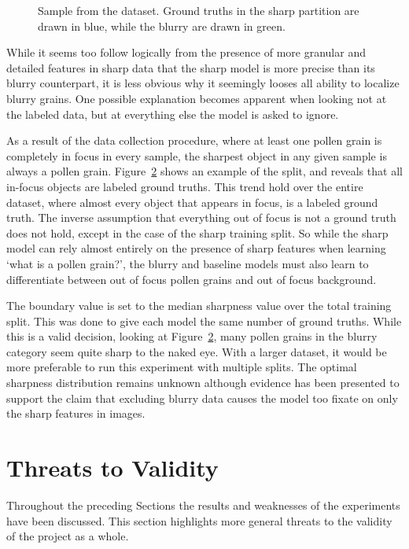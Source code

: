 \begin{figure}[htbp]
\begin{subfigure}[t]{0.35\textwidth}
    \label{fig:results-sharpness-blurry}
  \end{subfigure}
  \caption[Data sample showing split between sharp and blurry data]{%
Sample from the dataset. Ground truths in the sharp partition are drawn in \textcolor{poaceae}{blue}, while the blurry are drawn in \textcolor{alnus}{green}.
  }\label{fig:results-sharp-gt}
\end{figure}

While it seems too follow logically from the presence of more granular and detailed features in sharp data that the sharp model is more precise than its blurry counterpart, it is less obvious why it seemingly looses all ability to localize blurry grains.
One possible explanation becomes apparent when looking not at the labeled data, but at everything else the model is asked to ignore.

As a result of the data collection procedure, where at least one pollen grain is completely in focus in every sample, the sharpest object in any given sample is always a pollen grain.
Figure~\ref{fig:results-sharp-gt} shows an example of the split, and reveals that all in-focus objects are labeled ground truths. 
This trend hold over the entire dataset, where almost every object that appears in focus, is a labeled ground truth.
The inverse assumption that everything out of focus is not a ground truth does not hold, except in the case of the sharp training split.
So while the sharp model can rely almost entirely on the presence of sharp features when learning `what is a pollen grain?', the blurry and baseline models must also learn to differentiate between out of focus pollen grains and out of focus background.

The boundary value is set to the median sharpness value over the total training split.
This was done to give each model the same number of ground truths.
While this is a valid decision, looking at Figure~\ref{fig:results-sharp-gt}, many pollen grains in the blurry category seem quite sharp to the naked eye.
With a larger dataset, it would be more preferable to run this experiment with multiple splits.
The optimal sharpness distribution remains unknown although evidence has been presented to support the claim that excluding blurry data causes the model too fixate on only the sharp features in images.

\section{Threats to Validity}\label{sec:results-validity}
Throughout the preceding Sections the results and weaknesses of the experiments have been discussed.
This section highlights more general threats to the validity of the project as a whole.

